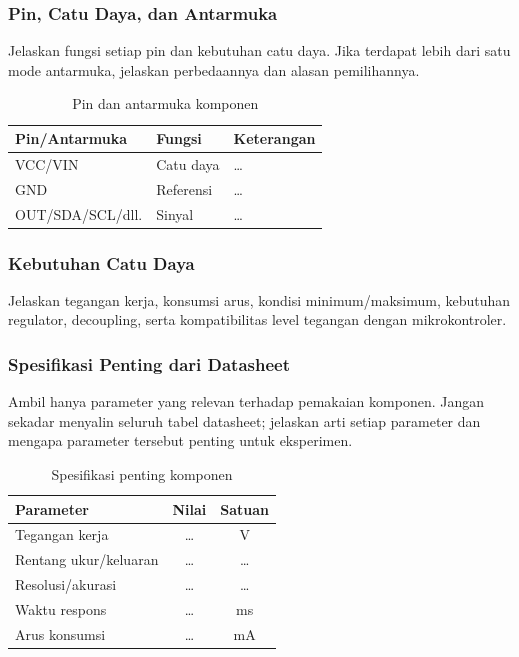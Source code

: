 \subsubsection{Pin, Catu Daya, dan Antarmuka}
Jelaskan fungsi setiap pin dan kebutuhan catu daya. Jika terdapat lebih dari
satu mode antarmuka, jelaskan perbedaannya dan alasan pemilihannya.

\begin{table}[H]
\centering
\caption{Pin dan antarmuka komponen}
\begin{tabularx}{\textwidth}{@{}lXX@{}}
\toprule
Pin/Antarmuka & Fungsi & Keterangan \\
\midrule
VCC/VIN & Catu daya & \dots \\
GND & Referensi & \dots \\
OUT/SDA/SCL/dll. & Sinyal & \dots \\
\bottomrule
\end{tabularx}
\end{table}

\subsubsection{Kebutuhan Catu Daya}
Jelaskan tegangan kerja, konsumsi arus, kondisi minimum/maksimum, kebutuhan
regulator, decoupling, serta kompatibilitas level tegangan dengan
mikrokontroler.

\subsubsection{Spesifikasi Penting dari Datasheet}
Ambil hanya parameter yang relevan terhadap pemakaian komponen. Jangan sekadar
menyalin seluruh tabel datasheet; jelaskan arti setiap parameter dan mengapa
parameter tersebut penting untuk eksperimen.

\begin{table}[H]
\centering
\caption{Spesifikasi penting komponen}
\begin{tabular}{@{}lcc@{}}
\toprule
Parameter & Nilai & Satuan \\
\midrule
Tegangan kerja & \dots & \si{\volt} \\
Rentang ukur/keluaran & \dots & \dots \\
Resolusi/akurasi & \dots & \dots \\
Waktu respons & \dots & \si{\milli\second} \\
Arus konsumsi & \dots & \si{\milli\ampere} \\
\bottomrule
\end{tabular}
\end{table}

